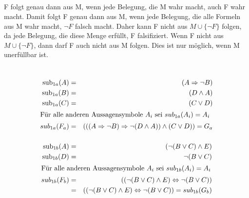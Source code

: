 \documentclass[10pt,a4paper,oneside,ngerman,numbers=noenddot]{scrartcl}
\begin{document}
\subsection{} %
F folgt genau dann aus M, wenn jede Belegung, die M wahr macht, auch F wahr macht. Damit folgt F genau dann aus M, wenn jede Belegung, die alle Formeln aus M wahr macht, $\neg F$ falsch macht. Daher kann F nicht aus $M \cup \{\neg F\}$ folgen, da jede Belegung, die diese Menge erfüllt, F falsifiziert. Wenn F nicht aus $M \cup \{\neg F\}$, dann darf F auch nicht aus M folgen. Dies ist nur möglich, wenn M unerfüllbar ist.
\section{} %
\subsection{} %
\setcounter{subsubsection}{0}
\subsubsection{} %
\begin{alignat*}{2}
\text{sub}_{1a}(A) &=& (A \Rightarrow \neg B) \\
\text{sub}_{1a}(B) &=& (D \wedge A) \\
\text{sub}_{1a}(C) &=& (C \vee D) \\
\intertext{Für alle anderen Aussagensymbole $A_{i}$ sei $sub_{1a}(A_{i}) = A_{i}$}
sub_{1a}(F_{a}) &=& (((A \Rightarrow \neg B) \Rightarrow \neg(D \wedge A)) \wedge (C \vee D)) = G_{a}
\end{alignat*}
\subsubsection{} %
\begin{alignat*}{2}
\text{sub}_{1b}(A) &=& (\neg(B \vee C) \wedge E) \\
\text{sub}_{1b}(D) &=& \neg(B \vee C) \\
\intertext{Für alle anderen Aussagensymbole $A_{i}$ sei $sub_{1b}(A_{i}) = A_{i}$}
sub_{1b}(F_{b}) &=& ((\neg(B \vee C) \wedge E) \Leftrightarrow \neg(B \vee C)) \\ 
&=& ((\neg(B \vee C) \wedge E) \Leftrightarrow \neg(B \vee C)) = sub_{1b}(G_{b})
\end{alignat*}
\subsection{} %
\end{document}
